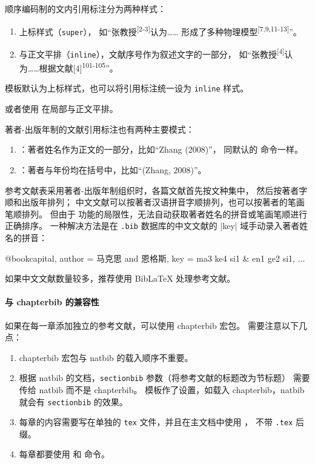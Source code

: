 \documentclass[a4paper]{ltxdoc}
\DeclareRobustCommand\file{\nolinkurl}
\DeclareRobustCommand\pkg{\textsf}
\DeclareRobustCommand\opt{\texttt}
\begin{document}
顺序编码制的文内引用标注分为两种样式：
\begin{enumerate}
  \item 上标样式（\opt{super}）， 如“张教授\textsuperscript{[2-3]}认为……
    形成了多种物理模型\textsuperscript{[7,9,11-13]}”。
  \item 与正文平排（\opt{inline}），文献序号作为叙述文字的一部分，
    如“张教授\textsuperscript{[4]}认为……根据文献[4]\textsuperscript{101-105}”。
\end{enumerate}

模板默认为上标样式，也可以将引用标注统一设为 \opt{inline} 样式。
\begin{latex}
\end{latex}
或者使用  在局部与正文平排。

著者-出版年制的文献引用标注也有两种主要模式：
\begin{enumerate}
  \item {}：著者姓名作为正文的一部分，比如“Zhang (2008)”，
    同默认的  命令一样。
  \item {}：著者与年份均在括号中，比如“(Zhang, 2008)”。
\end{enumerate}

参考文献表采用著者-出版年制组织时，各篇文献首先按文种集中， 然后按著者字顺和出版年排列；
中文文献可以按著者汉语拼音字顺排列，也可以按著者的笔画笔顺排列。
但由于 \BibTeX{} 功能的局限性，无法自动获取著者姓名的拼音或笔画笔顺进行正确排序。
一种解决方法是在 \file{.bib} 数据库的中文文献的 |key| 域手动录入著者姓名的拼音：
\begin{latex}
  @book{capital,
    author = {马克思 and 恩格斯},
    key    = {ma3 ke4 si1 & en1 ge2 si1},
    ...
  }
\end{latex}
如果中文文献数量较多，推荐使用 BibLaTeX 处理参考文献。

\paragraph{与 \pkg{chapterbib} 的兼容性}
如果在每一章添加独立的参考文献，可以使用 \pkg{chapterbib} 宏包。
需要注意以下几点：
\begin{enumerate}
  \item \pkg{chapterbib} 宏包与 \pkg{natbib} 的载入顺序不重要。
  \item 根据 \pkg{natbib} 的文档，\opt{sectionbib} 参数（将参考文献的标题改为节标题）
    需要传给 \pkg{natbib} 而不是 \pkg{chapterbib}。
    模板作了设置，如载入 \pkg{chapterbib}，\pkg{natbib} 就会有 \opt{sectionbib} 的效果。
  \item 每章的内容需要写在单独的 \file{tex} 文件，并且在主文档中使用 ，
    不带 \file{.tex} 后缀。
  \item 每章都要使用  和  命令。
\end{enumerate}
\end{document}
